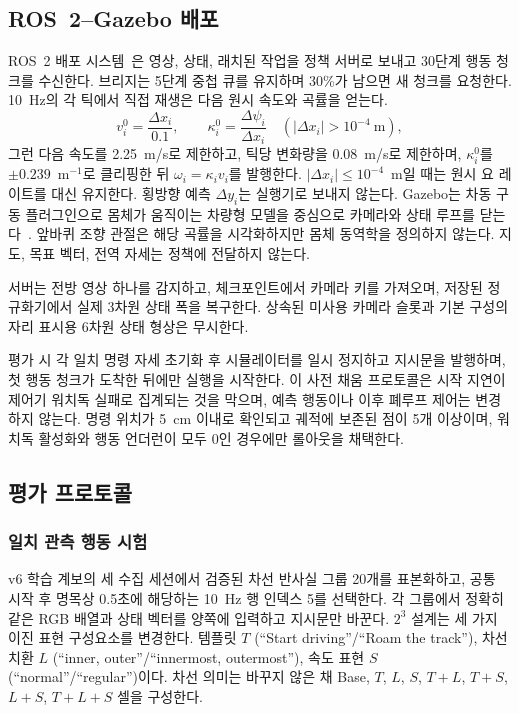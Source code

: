 \documentclass[letterpaper,conference]{IEEEtran}
\begin{document}
\subsection{ROS~2--Gazebo 배포}
ROS~2 배포 시스템~\cite{ros2}은 영상, 상태, 래치된 작업을 정책 서버로 보내고 30단계
행동 청크를 수신한다. 브리지는 5단계 중첩 큐를 유지하며 30\%가 남으면 새 청크를
요청한다. 10~Hz의 각 틱에서 직접 재생은 다음 원시 속도와 곡률을 얻는다.
\begin{equation}
v_i^{0}=\frac{\Delta x_i}{0.1},\qquad
\kappa_i^{0}=\frac{\Delta\psi_i}{\Delta x_i}\quad(|\Delta x_i|>10^{-4}\ \mathrm{m}),
\label{eq:replay}
\end{equation}
그런 다음 속도를 2.25~m/s로 제한하고, 틱당 변화량을 0.08~m/s로 제한하며,
$\kappa_i^0$를 $\pm0.239$~m$^{-1}$로 클리핑한 뒤 $\omega_i=\kappa_i v_i$를
발행한다. $|\Delta x_i|\le10^{-4}$~m일 때는 원시 요 레이트를 대신 유지한다. 횡방향
예측 $\Delta y_i$는 실행기로 보내지 않는다. Gazebo는 차동 구동 플러그인으로 몸체가
움직이는 차량형 모델을 중심으로 카메라와 상태 루프를 닫는다~\cite{gazebo}. 앞바퀴
조향 관절은 해당 곡률을 시각화하지만 몸체 동역학을 정의하지 않는다. 지도, 목표 벡터,
전역 자세는 정책에 전달하지 않는다.

서버는 전방 영상 하나를 감지하고, 체크포인트에서 카메라 키를 가져오며, 저장된
정규화기에서 실제 3차원 상태 폭을 복구한다. 상속된 미사용 카메라 슬롯과 기본 구성의
자리 표시용 6차원 상태 형상은 무시한다.

평가 시 각 일치 명령 자세 초기화 후 시뮬레이터를 일시 정지하고 지시문을 발행하며,
첫 행동 청크가 도착한 뒤에만 실행을 시작한다. 이 사전 채움 프로토콜은 시작 지연이
제어기 워치독 실패로 집계되는 것을 막으며, 예측 행동이나 이후 폐루프 제어는 변경하지
않는다. 명령 위치가 5~cm 이내로 확인되고 궤적에 보존된 점이 5개 이상이며, 워치독
활성화와 행동 언더런이 모두 0인 경우에만 롤아웃을 채택한다.

\subsection{평가 프로토콜}
\subsubsection{일치 관측 행동 시험}
v6 학습 계보의 세 수집 세션에서 검증된 차선 반사실 그룹 20개를 표본화하고, 공통
시작 후 명목상 0.5초에 해당하는 10~Hz 행 인덱스 5를 선택한다. 각 그룹에서 정확히
같은 RGB 배열과 상태 벡터를 양쪽에 입력하고 지시문만 바꾼다. $2^3$ 설계는 세 가지
이진 표현 구성요소를 변경한다. 템플릿 $T$ (``Start driving''/``Roam the track''),
차선 치환 $L$ (``inner, outer''/``innermost, outermost''), 속도 표현 $S$
(``normal''/``regular'')이다. 차선 의미는 바꾸지 않은 채 Base, $T$, $L$, $S$,
$T{+}L$, $T{+}S$, $L{+}S$, $T{+}L{+}S$ 셀을 구성한다.
\end{document}
